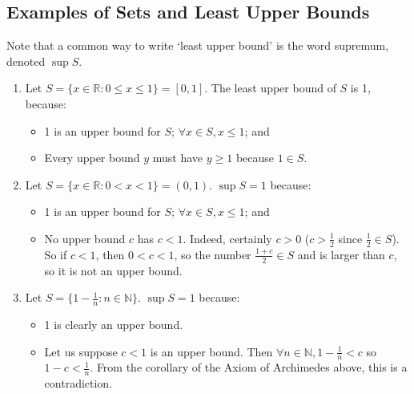 \subsection{Examples of Sets and Least Upper Bounds}
Note that a common way to write `least upper bound' is the word supremum, denoted \(\sup S\).
\begin{enumerate}
	\item Let \(S = \{ x \in \mathbb R: 0 \leq x \leq 1 \} = [0, 1]\).
	      The least upper bound of \(S\) is 1, because:
	      \begin{itemize}
		      \item 1 is an upper bound for \(S\); \(\forall x \in S, x\leq1 \); and
		      \item Every upper bound \(y\) must have \(y \geq 1\) because \(1 \in S\).
	      \end{itemize}
	\item Let \(S = \{ x \in \mathbb R: 0 < x < 1 \} = (0, 1)\).
	      \(\sup S = 1\) because:
	      \begin{itemize}
		      \item 1 is an upper bound for \(S\); \(\forall x \in S, x \leq 1\); and
		      \item No upper bound \(c\) has \(c<1\).
		            Indeed, certainly \(c>0\) (\(c > \frac{1}{2}\) since \(\frac{1}{2} \in S\)).
		            So if \(c<1\), then \(0<c<1\), so the number \(\frac{1+c}{2} \in S\) and is larger than \(c\), so it is not an upper bound.
	      \end{itemize}
	\item Let \(S = \{ 1 - \frac{1}{n}: n \in \mathbb N \}\).
	      \(\sup S = 1\) because:
	      \begin{itemize}
		      \item 1 is clearly an upper bound.
		      \item Let us suppose \(c < 1\) is an upper bound.
		            Then \(\forall n \in \mathbb N, 1 - \frac{1}{n} < c\) so \(1 - c < \frac{1}{n}\).
		            From the corollary of the Axiom of Archimedes above, this is a contradiction.
	      \end{itemize}
\end{enumerate}

